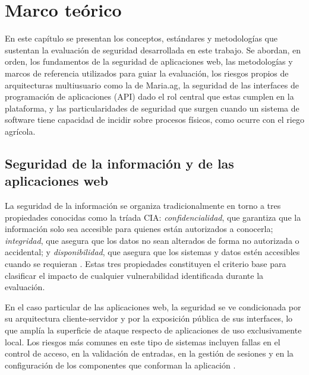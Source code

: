 \documentclass[12pt,letterpaper]{report}
\begin{document}
\chapter*{Marco teórico}

En este capítulo se presentan los conceptos, estándares y metodologías que
sustentan la evaluación de seguridad desarrollada en este trabajo. Se abordan,
en orden, los fundamentos de la seguridad de aplicaciones web, las
metodologías y marcos de referencia utilizados para guiar la evaluación, los
riesgos propios de arquitecturas multiusuario como la de Maria.ag, la
seguridad de las interfaces de programación de aplicaciones (API) dado el rol
central que estas cumplen en la plataforma, y las particularidades de
seguridad que surgen cuando un sistema de software tiene capacidad de incidir
sobre procesos físicos, como ocurre con el riego agrícola.

\section*{Seguridad de la información y de las aplicaciones web}

La seguridad de la información se organiza tradicionalmente en torno a tres
propiedades conocidas como la tríada CIA: \textit{confidencialidad}, que
garantiza que la información solo sea accesible para quienes están
autorizados a conocerla; \textit{integridad}, que asegura que los datos no
sean alterados de forma no autorizada o accidental; y \textit{disponibilidad},
que asegura que los sistemas y datos estén accesibles cuando se requieran
\autocite{stallings2018}. Estas tres propiedades constituyen el criterio base
para clasificar el impacto de cualquier vulnerabilidad identificada durante la
evaluación.

En el caso particular de las aplicaciones web, la seguridad se ve condicionada
por su arquitectura cliente-servidor y por la exposición pública de sus
interfaces, lo que amplía la superficie de ataque respecto de aplicaciones de
uso exclusivamente local. Los riesgos más comunes en este tipo de sistemas
incluyen fallas en el control de acceso, en la validación de entradas, en la
gestión de sesiones y en la configuración de los componentes que conforman la
aplicación \autocite{owasp2025top10}.
\end{document}
